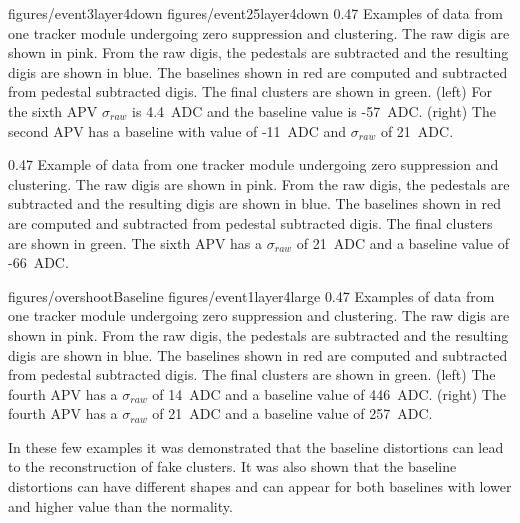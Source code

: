                  {figures/event3layer4down} %
                 {figures/event25layer4down} %
                 {0.47}       %
                 {Examples of data from one tracker module undergoing zero suppression and clustering. The raw digis are shown in pink. From the raw digis, the pedestals are subtracted and the resulting digis are shown in blue. The baselines shown in red are computed and subtracted from pedestal subtracted digis. The final clusters are shown in green. (left) For the sixth APV  $\sigma_{raw}$ is 4.4~ADC and the baseline value is -57~ADC. (right)  The second APV has a baseline with value of -11~ADC and  $\sigma_{raw}$ of 21~ADC.} %

                 {0.47}       %
                 {Example of data from one tracker module undergoing zero suppression and clustering. The raw digis are shown in pink. From the raw digis, the pedestals are subtracted and the resulting digis are shown in blue. The baselines shown in red are computed and subtracted from pedestal subtracted digis. The final clusters are shown in green. The sixth APV has a $\sigma_{raw}$ of 21~ADC and a baseline value of -66~ADC.} %


                 {figures/overshootBaseline} %
                 {figures/event1layer4large} %
                 {0.47}       %
                 { Examples of data from one tracker module undergoing zero suppression and clustering. The raw digis are shown in pink. From the raw digis, the pedestals are subtracted and the resulting digis are shown in blue. The baselines shown in red are computed and subtracted from pedestal subtracted digis. The final clusters are shown in green. (left) The fourth APV has a $\sigma_{raw}$ of 14~ADC and a baseline value of 446~ADC. (right)  The fourth APV has a $\sigma_{raw}$ of 21~ADC and a baseline value of 257~ADC.} %

In these few examples it was demonstrated that the baseline distortions can lead to the reconstruction of fake clusters. It was also shown that the baseline distortions can have different shapes and can appear for both baselines with lower and higher value than the normality.

